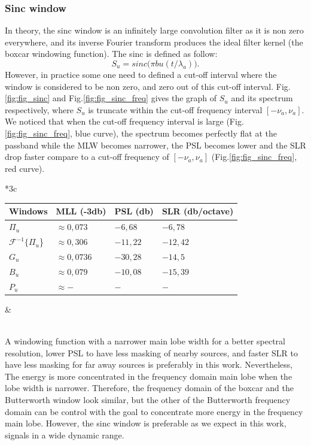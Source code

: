 \documentclass[useAMS,usenatbib]{mn2e}
\begin{document}
\subsubsection{Sinc window}
In theory, the sinc window  is an infinitely large convolution filter as it is non zero everywhere, and its inverse Fourier transform produces
 the ideal filter kernel (the boxcar windowing function). The sinc is defined as follow:
\begin{equation}
S_u= sinc\big(\pi bu(t/\lambda_a)\big).
\end{equation}
However, in practice some one need to defined a cut-off interval where the window is considered to be non zero, and zero out of this 
cut-off interval. Fig.\ref{fig:fig_sinc} and Fig.\ref{fig:fig_sinc_freq} gives the graph of $S_{u}$ and its spectrum respectively, where 
$S_{u}$ is truncate within the cut-off frequency interval $[-\nu_a,\nu_a]$. We noticed that when the cut-off frequency interval is large 
(Fig.\ref{fig:fig_sinc_freq}, blue curve), the spectrum becomes perfectly flat at the passband while the MLW becomes narrower,  the PSL 
becomes lower and the SLR drop faster compare to a cut-off frequency of $[-\nu_a,\nu_a]$ (Fig.\ref{fig:fig_sinc_freq}, red curve). \\
\begin{tabular}{*3{c}}
 \\
 \begin{tabular}{|l|l|l|l|}
  \footnotesize Windows &\textbf{\footnotesize MLL (-3db)}&\textbf{\footnotesize PSL (db)} &\textbf{\footnotesize SLR (db/octave) }  \\
  \hline\hline
  {\footnotesize $\Pi_{u}$} &{\footnotesize $\approx 0,073$} &{\footnotesize $-6,68$}&{\footnotesize $-6,78$}\\
  {\footnotesize $\mathcal{F}^{-1}\{\Pi_{u}$\}} &{\footnotesize  $\approx0,306$}&{\footnotesize  $-11,22$}&{\footnotesize  $-12,42$} \\
  {\footnotesize $G_{u}$} & {\footnotesize $\approx0,0736$}&{\footnotesize  $-30,28$}&{\footnotesize  $-14,5$}\\ 
  {\footnotesize $B_{u}$} &{\footnotesize  $\approx0,079$} &{\footnotesize $-10,08$ }&{\footnotesize  $-15,39$}\\
  {\footnotesize $P_{u}$} &{\footnotesize  $\approx- $} &{\footnotesize $ -$ }&{\footnotesize  $ -$}
  \end{tabular}& \label{BDWBnoise}
\end{tabular}\\
A windowing function with a narrower main lobe width for a better spectral resolution, lower PSL to have less
masking of nearby sources, and faster SLR to have less masking for far away sources  is preferably in this work. 
Nevertheless, The energy is more concentrated in the frequency domain main lobe when the  lobe width is narrower. Therefore, the frequency 
domain of the boxcar  and the Butterworth window look similar, but the other of the Butterworth frequency domain can be control with the 
goal to concentrate more energy in the frequency main lobe. However, the  sinc window is preferable as we expect in this work, signals in a 
wide dynamic range.
\end{document}
